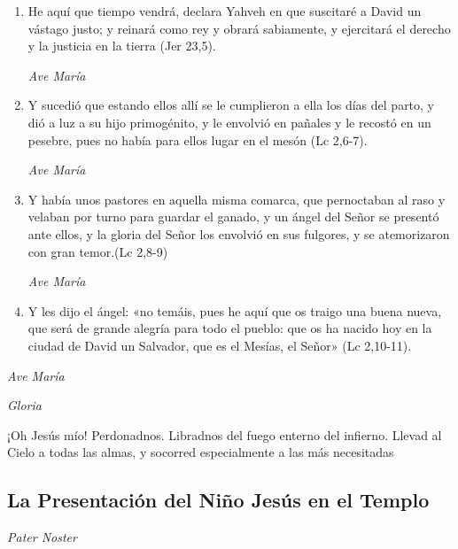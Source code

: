 \documentclass[a4paper,11pt, oneside]{report}
\begin{document}
\begin{enumerate}
          \item He aquí que tiempo vendrá, declara Yahveh en que suscitaré a David un vástago justo; y reinará como rey y obrará sabiamente, y ejercitará el derecho y la justicia en la tierra (Jer 23,5).

          \textit{Ave María}

          \item Y sucedió que estando ellos allí se le cumplieron a ella los días del parto, y dió a luz a su hijo primogénito, y le envolvió en pañales y le recostó en un pesebre, pues no había para ellos lugar en el mesón (Lc 2,6-7).
          
          \textit{Ave María}

          \item Y había unos pastores en aquella misma comarca, que pernoctaban al raso y velaban por turno para guardar el ganado, y un ángel del Señor se presentó ante ellos, y la gloria del Señor los envolvió en sus fulgores, y se atemorizaron con gran temor.(Lc 2,8-9)
          
          \textit{Ave María}

          \item Y les dijo el ángel: «no temáis, pues he aquí que os traigo una buena nueva, que será de grande alegría para todo el pueblo: que os ha nacido hoy en la ciudad de David un Salvador, que es el Mesías, el Señor» (Lc 2,10-11).

        \end{enumerate}

        \textit{Ave María} \par
        \indent\textit{Gloria} \par
        \indent¡Oh Jesús mío! Perdonadnos. Libradnos del fuego enterno del infierno. Llevad al Cielo a todas las almas, y socorred especialmente a las más 
        necesitadas

      \subsection*{La Presentación del Niño Jesús en el Templo}
      
        \textit{Pater Noster}
\end{document}
